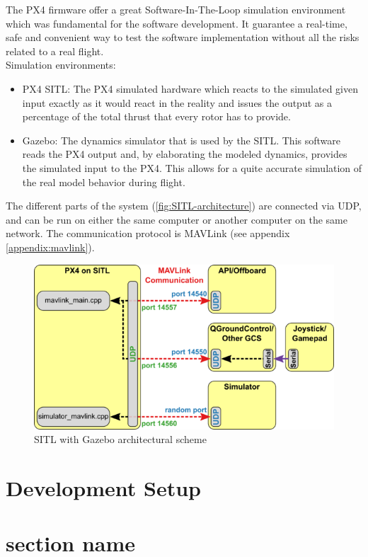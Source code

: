The PX4 firmware offer a great Software-In-The-Loop  simulation environment which was fundamental for the software development. It guarantee a real-time, safe and convenient way to test the software implementation without all the risks related to a real flight.\\
Simulation environments:
\begin{itemize}
 	\item PX4 SITL: The PX4 simulated hardware which reacts to the simulated given input exactly as it would react in the reality and issues the output as a percentage of the total thrust that every rotor has to provide.
 	\item Gazebo: The dynamics simulator that is used by the SITL. This software reads the PX4 output and, by elaborating the modeled dynamics, provides the simulated input to the PX4. This allows for a quite accurate simulation of the real model behavior during flight.
 \end{itemize}
 The different parts of the system (\autoref{fig:SITL-architecture}) are connected via UDP, and can be run on either the same computer or another computer on the same network. The communication protocol is MAVLink (see appendix \ref{appendix:mavlink}).
 \begin{figure}[ht]
    \centering
    \includegraphics[width=.7\textwidth]{figures/C4/Px4_sitl_overview}
    \caption{SITL with Gazebo architectural scheme}
    \label{fig:SITL-architecture}
\end{figure}
\section{Development Setup} %
\label{sec:development_setup}{}

{}
\section{section name} %
\label{sec:section_name}


